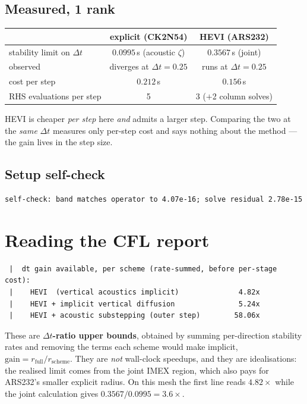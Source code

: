 \documentclass[11pt,a4paper]{article}
\begin{document}
\subsection{Measured, 1 rank}
\begin{center}
\begin{tabular}{lcc}
\toprule
 & explicit (CK2N54) & HEVI (ARS232)\\
\midrule
stability limit on $\Delta t$ & $0.0995$\,s (acoustic $\zeta$) & $\bm{0.3567}$\,s (joint)\\
observed & diverges at $\Delta t=0.25$ & runs at $\Delta t=0.25$\\
cost per step & $0.212$\,s & $\bm{0.156}$\,s\\
RHS evaluations per step & 5 & 3 ($+$2 column solves)\\
\bottomrule
\end{tabular}
\end{center}
HEVI is cheaper \emph{per step} here \emph{and} admits a larger step. Comparing
the two at the \emph{same} $\Delta t$ measures only per-step cost and says
nothing about the method --- the gain lives in the step size.

\subsection{Setup self-check}
\begin{lstlisting}
self-check: band matches operator to 4.07e-16; solve residual 2.78e-15
\end{lstlisting}

\section{Reading the CFL report}
\begin{lstlisting}
 |  dt gain available, per scheme (rate-summed, before per-stage cost):
 |    HEVI  (vertical acoustics implicit)              4.82x
 |    HEVI + implicit vertical diffusion               5.24x
 |    HEVI + acoustic substepping (outer step)        58.06x
\end{lstlisting}
These are \textbf{$\Delta t$-ratio upper bounds}, obtained by summing
per-direction stability rates and removing the terms each scheme would make
implicit, $\text{gain}=r_{\mathrm{full}}/r_{\mathrm{scheme}}$. They are
\emph{not} wall-clock speedups, and they are idealisations: the realised limit
comes from the joint IMEX region, which also pays for ARS232's smaller explicit
radius. On this mesh the first line reads $4.82\times$ while the joint
calculation gives $0.3567/0.0995=3.6\times$.
\end{document}
